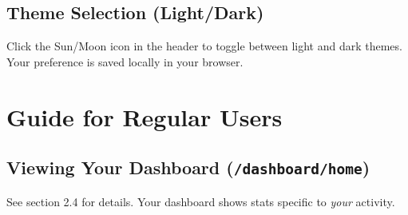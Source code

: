 \documentclass{article}
\begin{document}
\subsection{Theme Selection (Light/Dark)}
Click the Sun/Moon icon in the header to toggle between light and dark themes. Your preference is saved locally in your browser.

\section{Guide for Regular Users}

\subsection{Viewing Your Dashboard (\texttt{/dashboard/home})}
See section 2.4 for details. Your dashboard shows stats specific to \textit{your} activity.
\end{document}
